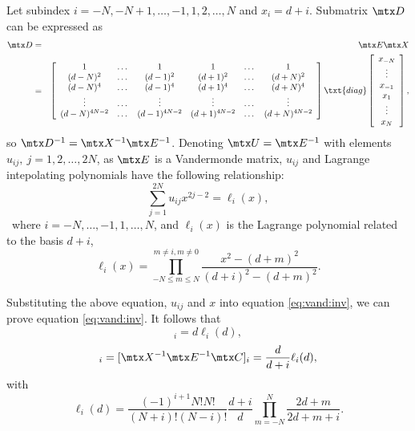Let subindex $i=-N,-N+1,\dots,-1,1,2,\dots,N$ and $x_i=d+i$.
Submatrix $\mtx D$ can be expressed as
\begin{eqnarray*}
\mtx D &=& \mtx E\mtx X \\
&=&
\left[\begin{array}{cccccc}
1 & \dots &1 &1 & \dots & 1 \\ 
(d-N)^2 & \dots & (d-1)^2 &(d+1)^2 & \dots & (d+N)^2 \\
(d-N)^4 & \dots & (d-1)^4 &(d+1)^4 & \dots & (d+N)^4 \\
\vdots & \dots & \vdots  & \vdots &\dots &\vdots \\
(d-N)^{4N-2} & \dots & (d-1)^{4N-2} & (d+1)^{4N-2} & \dots & (d+N)^{4N-2}
\end{array}\right]\txt{diag}
\left[\begin{array}{c}
x_{-N}\\ \vdots \\ x_{-1} \\ x_1 \\ \vdots \\ x_N
\end{array}\right],
\end{eqnarray*}
so $\mtx D^{-1}=\mtx X^{-1}\mtx E^{-1}$.
Denoting $\mtx U=\mtx E^{-1}$ with elements $u_{ij},~j=1,2,\dots,2N$,
as $\mtx E$ is a Vandermonde matrix,
$u_{ij}$ and Lagrange intepolating polynomials have the following relationship:
\begin{equation}\label{eq:vand:inv}
\sum_{j=1}^{2N}u_{ij}x^{2j-2}=\ell_i(x),
\end{equation}\
where $i=-N,\dots,-1,1,\dots,N$, 
and $\ell_i(x)$ is the Lagrange polynomial related to the basis $d+i$,
\begin{equation}\label{eq:lag}
\ell_i(x)=
\prod_{-N\leq m\leq N}^{m\neq i,m\neq 0}
\frac{x^2-(d+m)^2}{(d+i)^2-(d+m)^2}.
\end{equation}

Substituting the above equation, $u_{ij}$ and $x$ 
into equation \ref{eq:vand:inv},
we can prove equation \ref{eq:vand:inv}.
It follows that
\begin{equation}
[\mtx E^{-1}\mtx C]_i=d\ell_i(d),
\end{equation}
\begin{equation}
[\mtx D^{-1}\mtx C]_i=
[\mtx X^{-1}\mtx E^{-1}\mtx C]_i=
\frac{d}{d+i}\ell_i(d),
\end{equation}
with
\begin{equation}
\ell_i(d)=\frac{(-1)^{i+1}N!N!}{(N+i)!(N-i)!}
\frac{d+i}{d}
\prod_{m=-N}^N \frac{2d+m}{2d+m+i}.
\end{equation}

